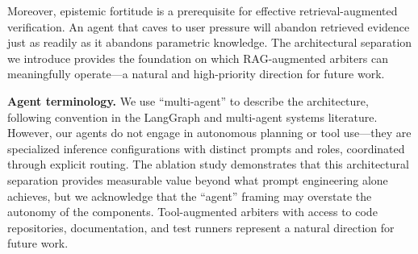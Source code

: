 Moreover, epistemic fortitude is a prerequisite for effective retrieval-augmented verification. An agent that caves to user pressure will abandon retrieved evidence just as readily as it abandons parametric knowledge. The architectural separation we introduce provides the foundation on which RAG-augmented arbiters can meaningfully operate---a natural and high-priority direction for future work.

\textbf{Agent terminology.} We use ``multi-agent'' to describe the architecture, following convention in the LangGraph and multi-agent systems literature. However, our agents do not engage in autonomous planning or tool use---they are specialized inference configurations with distinct prompts and roles, coordinated through explicit routing. The ablation study demonstrates that this architectural separation provides measurable value beyond what prompt engineering alone achieves, but we acknowledge that the ``agent'' framing may overstate the autonomy of the components. Tool-augmented arbiters with access to code repositories, documentation, and test runners represent a natural direction for future work.
